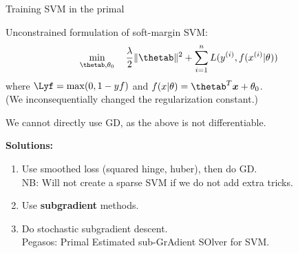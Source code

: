 \begin{vbframe}{Training SVM in the primal}

Unconstrained formulation of soft-margin SVM:
$$
\min\limits_{\thetab, \theta_0} \quad \frac{\lambda}{2} \|\thetab\|^2 + \sumin \Lxyit
$$
where $\Lyf = \max(0, 1 -  y f)$ and $\fxt = \thetab^T \xv + \theta_0$.\\ 
(We inconsequentially changed the regularization constant.)

\vspace*{2mm}

We cannot directly use GD, as the above is not differentiable.

\vspace*{2mm}

\textbf{Solutions:}
\begin{enumerate}
\item Use smoothed loss (squared hinge, huber), then do GD.\\
  NB: Will not  create a sparse SVM if we do not add extra tricks.
\item Use \textbf{subgradient} methods.
\item Do stochastic subgradient descent.\\
  Pegasos: Primal Estimated sub-GrAdient SOlver for SVM.
\end{enumerate}
\end{vbframe}







